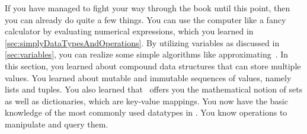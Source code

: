 %
%
\begin{table}%
%
\caption{Some properties of the four basic collection datatypes of \python, namely~, , , and~.}%
\label{tbl:collectionProperties}%
%
\centering%
%
%
\end{table}%
%
If you have managed to fight your way through the book until this point, then you can already do quite a few things.
You can use the computer like a fancy calculator by evaluating numerical expressions, which you learned in
\cref{sec:simplyDataTypesAndOperations}.
By utilizing variables as discussed in \cref{sec:variables}, you can realize some simple algorithms like approximating~\numberPi.
In this section, you learned about compound data structures that can store multiple values.
You learned about mutable and immutable sequences of values, namely lists and tuples.
You also learned that \python\ offers you the mathematical notion of sets as well as dictionaries, which are key-value mappings.
You now have the basic knowledge of the most commonly used datatypes in \python.
You know operations to manipulate and query them.

